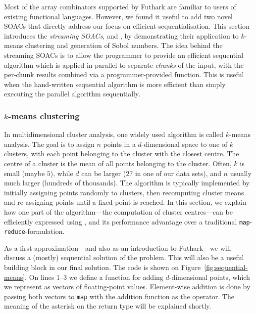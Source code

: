 Most of the array combinators supported by Futhark are familiar to
users of existing functional languages.  However, we found it useful
to add two novel SOACs that directly address our focus on efficient
sequentialisation.  This section introduces the \textit{streaming
  SOACs}, \StreamRed{} and \StreamMap{}, by demonstrating their
application to $k$-means clustering and generation of Sobol numbers.
The idea behind the streaming SOACs is to allow the programmer to
provide an efficient sequential algorithm which is applied in parallel
to separate \textit{chunks} of the input, with the per-chunk results
combined via a programmer-provided function.  This is useful when the
hand-written sequential algorithm is more efficient than simply
executing the parallel algorithm sequentially.

\subsubsection{$k$-means clustering}

In multidimensional cluster analysis, one widely used algorithm is
called $k$-means analysis.  The goal is to assign $n$ points in a
$d$-dimensional space to one of $k$ clusters, with each point
belonging to the cluster with the closest centre.  The centre of a
cluster is the mean of all points belonging to the cluster.  Often,
$k$ is small (maybe $5$), while $d$ can be larger ($27$ in one of our
data sets), and $n$ usually much larger (hundreds of thousands).  The
algorithm is typically implemented by initially assigning points
randomly to clusters, then recomputing cluster means and re-assigning
points until a fixed point is reached.  In this section, we explain
how one part of the algorithm---the computation of cluster
centres---can be efficiently expressed using \StreamRed{}, and
its performance advantage over a traditional
\texttt{map}-\texttt{reduce}-formulation.

As a first approximation---and also as an introduction to Futhark---we
will discuss a (mostly) sequential solution of the problem.  This will
also be a useful building block in our final solution.  The code is
shown on Figure~\ref{fig:sequential-means}.  On lines 1--3 we define a
function for adding $d$-dimensional points, which we represent as
vectors of floating-point values.  Element-wise addition is done by
passing both vectors to \texttt{map} with the addition function as the
operator.  The meaning of the asterisk on the return type will be
explained shortly.

